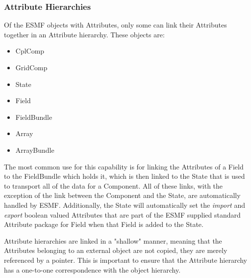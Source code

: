 \subsubsection{Attribute Hierarchies}

Of the ESMF objects with Attributes, only some can link their Attributes together in an Attribute hierarchy.  These objects are:

\begin{itemize}
\item CplComp
\item GridComp
\item State
\item Field
\item FieldBundle
\item Array
\item ArrayBundle
\end{itemize}

The most common use for this capability is for linking the Attributes of a Field to the FieldBundle which holds it, which is then linked to the State that is used to transport all of the data for a Component.  All of these links, with the exception of the link between the Component and the State, are automatically handled by ESMF. Additionally, the State will automatically set the {\it import} and {\it export} boolean valued Attributes that are part of the ESMF supplied standard Attribute package for Field when that Field is added to the State. 

Attribute hierarchies are linked in a "shallow" manner, meaning that the Attributes belonging to an external object are not copied, they are merely referenced by a pointer.  This is important to ensure that the Attribute hierarchy has a one-to-one correspondence with the object hierarchy.  
